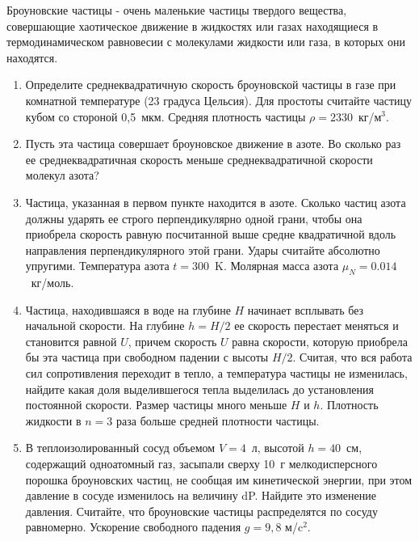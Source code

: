 
Броуновские частицы - очень маленькие частицы твердого вещества, совершающие хаотическое движение в 
жидкостях или газах находящиеся в термодинамическом равновесии с молекулами жидкости или газа, в которых 
они находятся.

\begin{enumerate}
    \item Определите среднеквадратичную скорость броуновской частицы в газе при комнатной температуре 
    (23 градуса Цельсия). Для простоты считайте частицу кубом со стороной 0,5~мкм. 
    Средняя плотность частицы $\rho=2330$~кг/м$^3$.
    \item Пусть эта частица совершает броуновское движение в азоте. Во сколько раз ее среднеквадратичная 
    скорость меньше среднеквадратичной скорости молекул азота?
    \item Частица, указанная в первом пункте находится в азоте. Сколько частиц азота должны ударять ее 
    строго перпендикулярно одной грани, чтобы она приобрела скорость равную посчитанной выше средне 
    квадратичной вдоль направления перпендикулярного этой грани. Удары считайте абсолютно упругими. 
    Температура азота $t = 300$~K. Молярная масса азота $\mu_N= 0.014$~кг/моль.
    \item Частица, находившаяся в воде на глубине $H$ начинает всплывать без начальной скорости. На глубине 
    $h = H/2$ ее скорость перестает меняться и становится равной $U$, причем скорость $U$ равна скорости, 
    которую приобрела бы эта частица при свободном падении с высоты $H/2$. Считая, что вся работа сил 
    сопротивления переходит в тепло, а температура частицы не изменилась, найдите какая доля выделившегося 
    тепла выделилась до установления постоянной скорости. Размер частицы много меньше $H$ и $h$. Плотность 
    жидкости в $n=3$ раза больше средней плотности частицы.
    \item В теплоизолированный сосуд объемом $V = 4$~л, высотой $h = 40$~см, содержащий одноатомный газ, 
    засыпали сверху 10~г мелкодисперсного порошка броуновских частиц, не сообщая им кинетической энергии, 
    при этом давление в сосуде изменилось на величину dP. Найдите это изменение давления. Считайте, что 
    броуновские частицы распределятся по сосуду равномерно. Ускорение свободного падения $g =9,8$ м/c$^2$.
\end{enumerate}